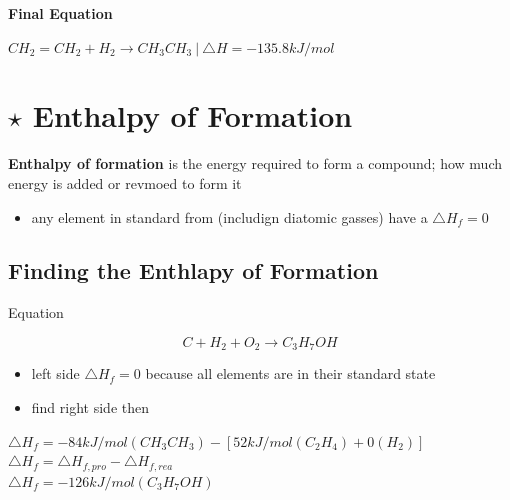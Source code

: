 \documentclass[12pt]{article} %
\begin{document}
\textbf{Final Equation}

$CH_2=CH_2+H_2\rightarrow CH_3CH_3\ |\ \triangle{H}=-135.8kJ/mol$

\pagebreak

\section{$\star$ Enthalpy of Formation}

\textbf{Enthalpy of formation} is the energy required to form a compound; how much energy is added or revmoed to form it

\begin{itemize}
\item any element in standard from (includign diatomic gasses) have a $\triangle{H}_f = 0$
\end{itemize}

\subsection{Finding the Enthlapy of Formation}

Equation

$$C+H_2+O_2 \rightarrow C_3H_7OH$$

\begin{itemize}
\item left side $\triangle{H}_f = 0$ because all elements are in their standard state
\item find right side then
\end{itemize}

\centering
$\triangle{H}_f = -84kJ/mol(CH_3CH_3) - [52kJ/mol(C_2H_4) + 0(H_2)]$\\
$\triangle{H}_f = \triangle{H}_{f,pro} - \triangle{H}_{f,rea}$\\
$\triangle{H}_f = -126kJ/mol(C_3H_7OH)$
\end{document}
